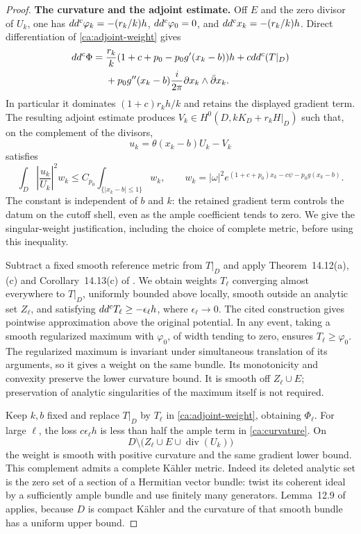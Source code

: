\begin{proof}
\smallskip\noindent\textbf{The curvature and the adjoint estimate.}\enspace
Off \(E\) and the zero divisor of \(U_k\), one has
\(dd^c\varphi_k=-(r_k/k)h\), \(dd^c\varphi_0=0\), and
\(dd^c x_k=-(r_k/k)h\).  Direct differentiation of
\eqref{ca:adjoint-weight} gives
\begin{align}
 dd^c\Phi={}&\frac{r_k}{k}(1+c+p_0-p_0g'(x_k-b))h
       +cdd^c(T|_D) \notag\\
 &+p_0g''(x_k-b)\frac{i}{2\pi}
               \partial x_k\wedge\bar\partial x_k.
                                                   \label{ca:curvature}
\end{align}
In particular it dominates \((1+c)r_kh/k\) and retains the displayed
gradient term.  The resulting adjoint estimate produces
\(V_k\in H^0(D,kK_D+r_kH|_D)\) such that, on the complement of
the divisors,
\[
 u_k=\theta(x_k-b)U_k-V_k
\]
satisfies
\begin{equation}\label{ca:l2-estimate}
 \int_D\left|\frac{u_k}{U_k}\right|^2w_k
 \leq C_{p_0}\int_{\{|x_k-b|\leq1\}}w_k,
 \qquad
 w_k=|\omega|^2
 e^{(1+c+p_0)x_k-c\psi-p_0g(x_k-b)}.
\end{equation}
The constant is independent of \(b\) and \(k\): the retained gradient
term controls the datum on the cutoff shell, even as the ample
coefficient tends to zero. We give the
singular-weight justification, including the choice of complete
metric, before using this inequality.

Subtract a fixed smooth reference metric from \(T|_D\) and apply
Theorem~14.12(a),(c) and Corollary~14.13(c) of \cite{Demailly12}.  We obtain
weights \(T_\ell\) converging almost everywhere to \(T|_D\),
uniformly bounded above locally, smooth outside an analytic set
\(Z_\ell\), and satisfying
\(dd^c T_\ell\geq-\epsilon_\ell h\), where
\(\epsilon_\ell\to0\).  The cited construction gives pointwise
approximation above the original potential.  In any event, taking
a smooth regularized maximum with \(\varphi_0\), of width tending
to zero, ensures \(T_\ell\geq\varphi_0\).  The regularized
maximum is invariant under simultaneous translation of its
arguments, so it gives a weight on the same bundle.  Its
monotonicity and convexity preserve the lower curvature bound.
It is smooth off \(Z_\ell\cup E\); preservation of analytic
singularities of the maximum itself is not required.

Keep \(k,b\) fixed and replace \(T|_D\) by \(T_\ell\) in
\eqref{ca:adjoint-weight}, obtaining \(\Phi_\ell\).
For large \(\ell\), the loss \(c\epsilon_\ell h\) is less than
half the ample term in \eqref{ca:curvature}.  On
\[
 D\setminus\bigl(Z_\ell\cup E\cup\operatorname{div}(U_k)\bigr)
\]
the weight is smooth with positive curvature and the same gradient
lower bound.  This complement admits a complete K\"ahler metric.
Indeed its deleted analytic set is the zero set of a section of a
Hermitian vector bundle: twist its coherent ideal by a sufficiently
ample bundle and use finitely many generators.  Lemma~12.9 of
\cite{Demailly12} applies, because \(D\) is compact K\"ahler and
the curvature of that smooth bundle has a uniform upper bound.


\end{proof}
